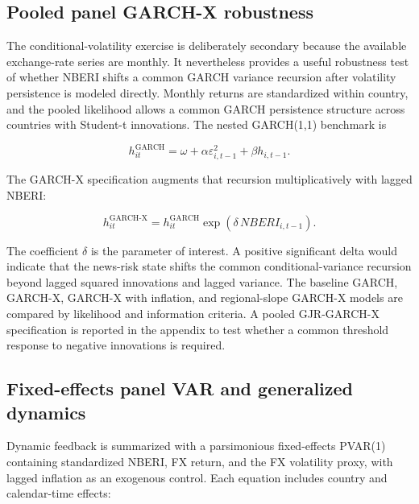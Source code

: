 \documentclass[11pt]{article}
\begin{document}
\subsection{Pooled panel GARCH-X
robustness}\label{pooled-panel-garch-x-robustness}

The conditional-volatility exercise is deliberately secondary because
the available exchange-rate series are monthly. It nevertheless provides
a useful robustness test of whether NBERI shifts a common GARCH variance
recursion after volatility persistence is modeled directly. Monthly
returns are standardized within country, and the pooled likelihood
allows a common GARCH persistence structure across countries with
Student-t innovations. The nested GARCH(1,1) benchmark is

\begin{equation}
\label{eq:pooled-garch}
h_{it}^{\mathrm{GARCH}}
=\omega+\alpha\varepsilon_{i,t-1}^{2}+\beta h_{i,t-1}.
\end{equation}

The GARCH-X specification augments that recursion multiplicatively with lagged NBERI:

\begin{equation}
\label{eq:pooled-garchx}
h_{it}^{\mathrm{GARCH\text{-}X}}
=h_{it}^{\mathrm{GARCH}}
\exp\!\left(\delta\,NBERI_{i,t-1}\right).
\end{equation}

The coefficient $\delta$ is the parameter of interest. A positive
significant delta would indicate that the news-risk state shifts the
common conditional-variance recursion beyond lagged squared innovations
and lagged variance. The baseline GARCH, GARCH-X, GARCH-X with
inflation, and regional-slope GARCH-X models are compared by likelihood
and information criteria. A pooled GJR-GARCH-X specification is reported
in the appendix to test whether a common threshold response to negative
innovations is required.

\subsection{Fixed-effects panel VAR and generalized
dynamics}\label{fixed-effects-panel-var-and-generalized-dynamics}

Dynamic feedback is summarized with a parsimonious fixed-effects PVAR(1)
containing standardized NBERI, FX return, and the FX volatility proxy,
with lagged inflation as an exogenous control. Each equation includes
country and calendar-time effects:
\end{document}
